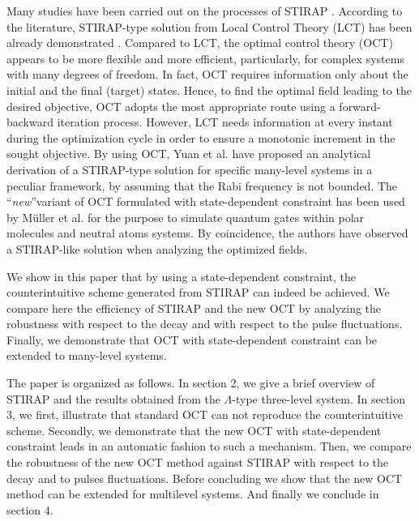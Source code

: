 \documentclass[]{interact}
\theoremstyle{plain}%
\theoremstyle{definition}
\theoremstyle{remark}
\begin{document}
Many studies have been carried out on the processes of STIRAP \cite{Bergmann2, 
Vitanov, 
Guerin}. According to the literature, STIRAP-type solution from Local 
Control Theory (LCT) has been already demonstrated \cite{Tannor, Bartana}. 
Compared to LCT, the optimal control theory (OCT) appears to be  more flexible 
and more efficient, particularly, for complex 
systems with many degrees of freedom. In fact, OCT requires information only 
about the initial and the final (target) states. Hence, to find the optimal 
field leading to the desired objective, OCT adopts the most appropriate route 
using a forward-backward iteration process. However, LCT needs information at 
every instant during the optimization cycle in order to ensure a monotonic 
increment in the sought objective.
By using OCT, Yuan et al. \cite{Yuan} have proposed an 
analytical derivation of a  STIRAP-type solution for specific many-level systems 
in a peculiar framework, 
by assuming that the Rabi frequency is not 
bounded.
The \textquotedblleft\textit{new}\textquotedblright variant of OCT formulated
with state-dependent constraint \cite{Koch} has 
been used by M\"uller et al. \cite{Muller} for the purpose to simulate quantum 
gates within 
polar molecules and neutral atoms systems. By  coincidence, the authors have 
observed a
STIRAP-like solution when analyzing the optimized fields.

We show in this paper that by using a 
state-dependent constraint, the counterintuitive scheme 
generated from STIRAP can indeed be achieved. 
We compare here the efficiency of 
STIRAP and the new OCT by analyzing the robustness with respect to the decay 
and 
with respect to the pulse fluctuations. Finally, we demonstrate that OCT with 
state-dependent constraint can be extended to many-level systems.  

The paper is organized as follows. In section 2, we give a brief overview of 
STIRAP and the results obtained from the $\Lambda$-type three-level system. In 
section 3, 
we first, illustrate that standard OCT can not reproduce the  counterintuitive 
scheme. Secondly, we demonstrate that the new OCT with state-dependent 
constraint leads in an automatic fashion to such a mechanism. 
Then, we compare the robustness of the new OCT method against STIRAP with 
respect to the decay and to pulses fluctuations. Before concluding we show that 
the new OCT method can be extended for multilevel systems. And finally we 
conclude in section 4.
\end{document}
